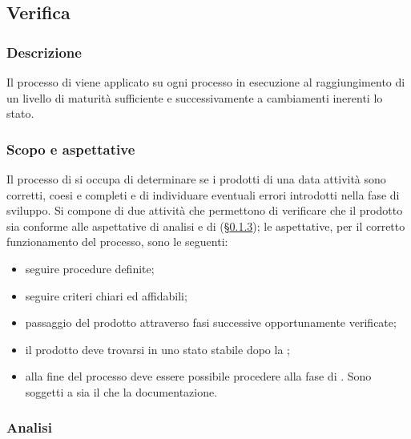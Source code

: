 {{\subsection{Verifica}
\subsubsection{Descrizione}
Il processo di  viene applicato su ogni processo in esecuzione al raggiungimento di un livello di maturità sufficiente e successivamente a cambiamenti inerenti lo stato.
\subsubsection{Scopo e aspettative}
Il processo di  si occupa di determinare se i prodotti di una data attività sono corretti, coesi e completi e di individuare eventuali errori introdotti nella fase di sviluppo. Si compone di due attività che permettono di verificare che il prodotto sia conforme alle aspettative di analisi e di  (\S{}\ref{veractivity}); le aspettative, per il corretto funzionamento del processo, sono le seguenti: 

\begin{itemize}
	\item seguire procedure definite;
	\item seguire criteri chiari ed affidabili;
	\item passaggio del prodotto attraverso fasi successive opportunamente verificate;
	\item il prodotto deve trovarsi in uno stato stabile dopo la ;
	\item alla fine del processo deve essere possibile procedere alla fase di . 
Sono soggetti a  sia il  che la documentazione. 
\end{itemize}
\subsubsection{Analisi} \label{veractivity}

}}
